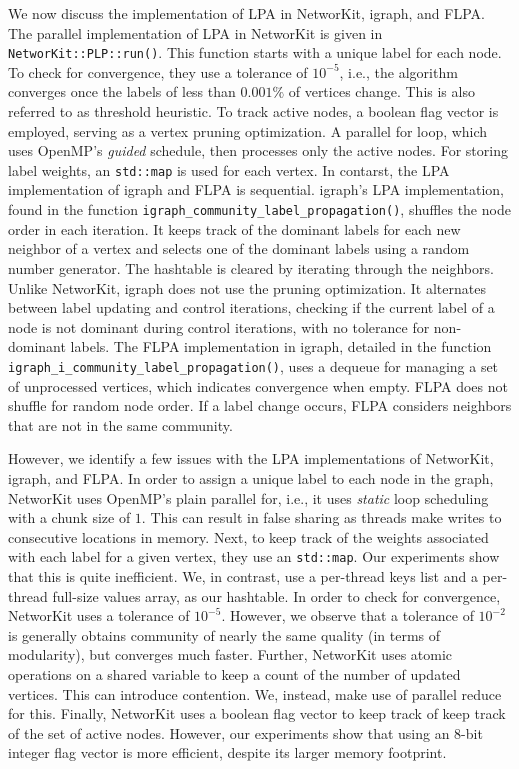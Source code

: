 We now discuss the implementation of LPA in NetworKit, igraph, and FLPA. The parallel implementation of LPA in NetworKit is given in \texttt{NetworKit::PLP::run()}. This function starts with a unique label for each node. To check for convergence, they use a tolerance of $10^{-5}$, i.e., the algorithm converges once the labels of less than $0.001\%$ of vertices change. This is also referred to as threshold heuristic. To track active nodes, a boolean flag vector is employed, serving as a vertex pruning optimization. A parallel for loop, which uses OpenMP's \textit{guided} schedule, then processes only the active nodes. For storing label weights, an \texttt{std::map} is used for each vertex. In contarst, the LPA implementation of igraph and FLPA is sequential. igraph's LPA implementation, found in the function \texttt{igraph\_community\_label\_propagation()}, shuffles the node order in each iteration. It keeps track of the dominant labels for each new neighbor of a vertex and selects one of the dominant labels using a random number generator. The hashtable is cleared by iterating through the neighbors. Unlike NetworKit, igraph does not use the pruning optimization. It alternates between label updating and control iterations, checking if the current label of a node is not dominant during control iterations, with no tolerance for non-dominant labels. The FLPA implementation in igraph, detailed in the function \texttt{igraph\_i\_community\_label\_propagation()}, uses a dequeue for managing a set of unprocessed vertices, which indicates convergence when empty. FLPA does not shuffle for random node order. If a label change occurs, FLPA considers neighbors that are not in the same community.

However, we identify a few issues with the LPA implementations of NetworKit, igraph, and FLPA. In order to assign a unique label to each node in the graph, NetworKit uses OpenMP's plain parallel for, i.e., it uses \textit{static} loop scheduling with a chunk size of $1$. This can result in false sharing as threads make writes to consecutive locations in memory. Next, to keep track of the weights associated with each label for a given vertex, they use an \texttt{std::map}. Our experiments show that this is quite inefficient. We, in contrast, use a per-thread keys list and a per-thread full-size values array, as our hashtable. In order to check for convergence, NetworKit uses a tolerance of $10^{-5}$. However, we observe that a tolerance of $10^{-2}$ is generally obtains community of nearly the same quality (in terms of modularity), but converges much faster. Further, NetworKit uses atomic operations on a shared variable to keep a count of the number of updated vertices. This can introduce contention. We, instead, make use of parallel reduce for this. Finally, NetworKit uses a boolean flag vector to keep track of keep track of the set of active nodes. However, our experiments show that using an 8-bit integer flag vector is more efficient, despite its larger memory footprint.

